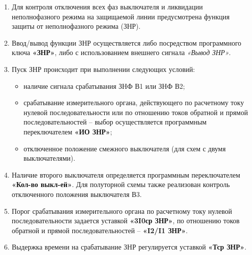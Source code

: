 \color{black}

\begin{enumerate}[label=\arabic{section}.\arabic{subsection}.\arabic{enumi}, labelsep=4pt, leftmargin=0pt, itemindent=57pt, itemsep=0pt, parsep=0pt] %

\item
Для контроля отключения всех фаз выключателя и ликвидации неполнофазного режима на защищаемой
линии предусмотрена функция защиты от неполнофазного режима (ЗНР).

\item
Ввод/вывод функции ЗНР осуществляется либо посредством программного ключа \textbf{«ЗНР»}, либо с
использованием внешнего сигнала \textit{«Вывод ЗНР»}.

\item
Пуск ЗНР происходит при выполнении следующих условий:
\begin{itemize}
\item наличие сигнала срабатывания ЗНФ В1 или ЗНФ В2;
\item срабатывание измерительного органа, действующего по расчетному току нулевой последовательности или по отношению токов обратной и прямой последовательностей -- выбор осуществляется программным переключателем \textbf{«ИО ЗНР»};
\item отключенное положение смежного выключателя (для схем с двумя выключателями).
\end{itemize}

\item
Наличие второго выключателя определяется программным переключателем \textbf{«Кол-во выкл-ей»}. Для
полуторной схемы также реализован контроль отключенного положения выключателя В3.

\item
Порог срабатывания измерительного органа по расчетному току нулевой последовательности задается
уставкой \textbf{«3I0ср ЗНР»}, по отношению токов обратной и прямой последовательностей – \textbf{«I2/I1 ЗНР»}.

\item
Выдержка времени на срабатывание ЗНР регулируется уставкой \textbf{«Тср ЗНР»}. 


\end{enumerate}
